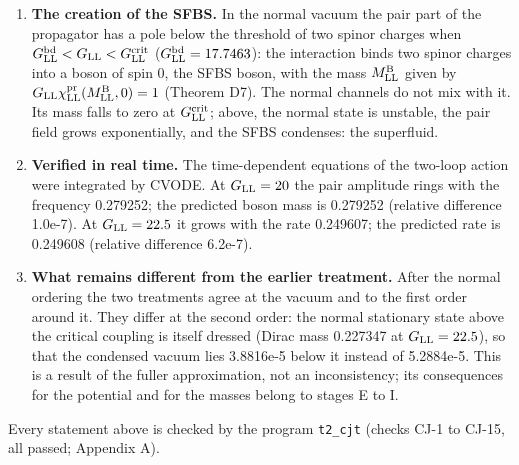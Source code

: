 \documentclass[
  10pt,
]{article}
\begin{document}
\begin{enumerate}
  fixed by two conditions: the vacuum is charge-symmetric at
  \(\mu_{\rm LL}=0\), and \(m_{\rm LL}\) is the Dirac mass of the vacuum
  (Theorem D6). The mass of the Lagrangian is then
  \(m^{\rm b}_{\rm LL}=m_{\rm LL}(1-3G_{\rm LL}/(4G^{\rm crit}_{\rm LL}))\)
  in the normal vacuum and \(m_{\rm LL}/4\) in the condensed one. With
  this reading the two-loop vacuum is the vacuum of the earlier
  treatment, with the same gap equation:
  \(G^{\rm crit}_{\rm LL}=21.28661\), and at \(G_{\rm LL}=22.5\) the gap
  \(\Delta^{\rm vac}_{\rm LL}=0.2094933\). An alternative that changes
  the interaction instead (its axially symmetric completion, Theorem D8)
  removes the dressing of the mass altogether; it is recorded and not
  adopted.
\item
  \textbf{The creation of the SFBS.} In the normal vacuum the pair part
  of the propagator has a pole below the threshold of two spinor charges
  when \(G^{\rm bd}_{\rm LL}<G_{\rm LL}<G^{\rm crit}_{\rm LL}\)
  (\(G^{\rm bd}_{\rm LL}=17.7463\)): the interaction binds two spinor
  charges into a boson of spin 0, the SFBS boson, with the mass
  \(M^{\rm B}_{\rm LL}\) given by
  \(G_{\rm LL}\chi^{\rm pr}_{\rm LL}(M^{\rm B}_{\rm LL},0)=1\) (Theorem
  D7). The normal channels do not mix with it. Its mass falls to zero at
  \(G^{\rm crit}_{\rm LL}\); above, the normal state is unstable, the
  pair field grows exponentially, and the SFBS condenses: the
  superfluid.
\item
  \textbf{Verified in real time.} The time-dependent equations of the
  two-loop action were integrated by CVODE. At \(G_{\rm LL}=20\) the
  pair amplitude rings with the frequency 0.279252; the predicted boson
  mass is 0.279252 (relative difference 1.0e-7). At \(G_{\rm LL}=22.5\)
  it grows with the rate 0.249607; the predicted rate is 0.249608
  (relative difference 6.2e-7).
\item
  \textbf{What remains different from the earlier treatment.} After the
  normal ordering the two treatments agree at the vacuum and to the
  first order around it. They differ at the second order: the normal
  stationary state above the critical coupling is itself dressed (Dirac
  mass 0.227347 at \(G_{\rm LL}=22.5\)), so that the condensed vacuum
  lies 3.8816e-5 below it instead of 5.2884e-5. This is a result of the
  fuller approximation, not an inconsistency; its consequences for the
  potential and for the masses belong to stages E to I.
\end{enumerate}

Every statement above is checked by the program \texttt{t2\_cjt} (checks
CJ-1 to CJ-15, all passed; Appendix A).
\end{document}
